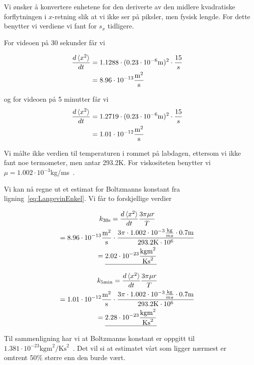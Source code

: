 \documentclass[a4paper,11pt, twocolumn]{article}
\begin{document}
Vi ønsker å konvertere enhetene for den deriverte av den midlere kvadratiske forflytningen i $x$-retning slik at vi ikke ser på piksler, men fysisk lengde. For dette benytter vi verdiene vi fant for $s_x$ tidligere.

For videoen på 30 sekunder får vi

\begin{align}
	\frac{d\braket{x^2}}{dt} &= 1.1288\cdot(0.23\cdot10^{-6}\text{m})^2\cdot\frac{15}{s}\\
	&= 8.96\cdot10^{-13}\frac{\text{m}^2}{\text{s}}
	\label{eq:dx230sek}
\end{align}

og for videoen på 5 minutter får vi
\begin{align}
	\frac{d\braket{x^2}}{dt} &= 1.2719\cdot(0.23\cdot10^{-6}\text{m})^2\cdot\frac{15}{s}\\
	&= 1.01\cdot10^{-12}\frac{\text{m}^2}{\text{s}}
	\label{eq:dx25min}
\end{align}

Vi målte ikke verdien til temperaturen i rommet på labdagen, ettersom vi ikke fant noe termometer, men antar 293.2K. For viskositeten benytter vi $\mu = 1.002\cdot10^{-3}$kg/ms~\cite{viscosity}.

Vi kan nå regne ut et estimat for Boltzmanns konstant fra ligning~\eqref{eq:LangevinEnkel}. Vi får to forskjellige verdier

\begin{gather}
	k_\text{30s}  = \frac{d\braket{x^2}}{dt} \frac{3\pi\mu r}{T}\\
	= 8.96\cdot10^{-13}\frac{\text{m}^2}{\text{s}}\cdot \frac{3\pi\cdot1.002\cdot 10^{-3}\frac{\text{kg}}{ms}\cdot 0.7  \text{m}}{293.2\text{K}\cdot10^{6}}\\
	= \underline{2.02\cdot10^{-23}\frac{\text{kgm}^2}{\text{Ks}^2}}
	\label{eq:boltzmann30sek}
\end{gather}

\begin{gather}
	k_\text{5min}  = \frac{d\braket{x^2}}{dt} \frac{3\pi\mu r}{T}\\
= 1.01\cdot10^{-12}\frac{\text{m}^2}{\text{s}}\cdot \frac{3\pi\cdot1.002\cdot 10^{-3}\frac{\text{kg}}{ms}\cdot 0.7\text{m}}{293.2\text{K}\cdot 10^6}\\
	= \underline{2.28\cdot10^{-23}\frac{\text{kgm}^2}{\text{Ks}^2}}
	\label{eq:boltzmann5min}
\end{gather}

Til sammenligning har vi at Boltzmanns konstant er oppgitt til $1.381\cdot10^{-23}\text{kgm}^2/\text{Ks}^2$~\cite[sek. 1.2]{Schroeder2000}. Det vil si at estimatet vårt som ligger nærmest er omtrent 50\% større enn den burde vært. 
\end{document}
